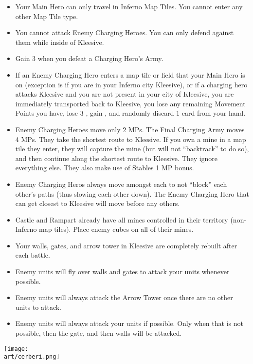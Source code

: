 \begin{multicols*}{2}
\begin{itemize}
  \item Your Main Hero can only travel in Inferno Map Tiles. You cannot enter any other Map Tile type.
  \item You cannot attack Enemy Charging Heroes. You can only defend against them while inside of Kleesive.
  \item Gain 3  when you defeat a Charging Hero's Army.
  \item If an Enemy Charging Hero enters a map tile or field that your Main Hero is on (exception is if you are in
    your Inferno city Kleesive), or if a charging hero attacks Kleesive and you are not present in your city
    of Kleesive, you are immediately transported back to Kleesive, you lose any remaining Movement Points
    you have, lose 3 , gain , and randomly discard 1 card from your hand.
  \item Enemy Charging Heroes move only 2 MPs. The Final Charging Army moves 4 MPs. They take the shortest
    route to Kleesive. If you own a mine in a map tile they enter, they will capture the mine (but will not
    ``backtrack'' to do so), and then continue along the shortest route to Kleesive. They ignore everything
    else. They also make use of Stables 1 MP bonus.
  \item Enemy Charging Heros always move amongst each to not ``block'' each other's paths (thus slowing each
    other down). The Enemy Charging Hero that can get closest to Kleesive will move before any others.
  \item Castle and Rampart already have all mines controlled in their territory (non-Inferno map tiles). Place enemy
    cubes on all of their mines.
  \item Your walls, gates, and arrow tower in Kleesive are completely rebuilt after each battle.
  \item Enemy  units will fly over walls and gates to attack your units whenever possible.
  \item Enemy  units will always attack the Arrow Tower once there are no other  units to attack.
  \item Enemy units will always attack your units if possible. Only when that is not possible, then the gate,
    and then walls will be attacked.
\end{itemize}

\vspace*{1em}
\texttt{[image: \\art/cerberi.png]}

\end{multicols*}

